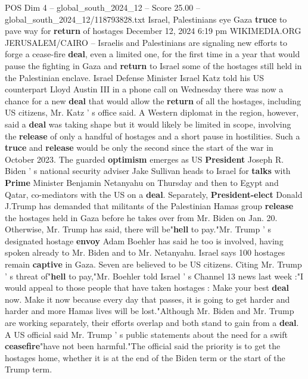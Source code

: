 \begin{textsample}{POS Dim 4 – global\_south\_2024\_12 – Score 25.00 – global\_south\_2024\_12/118793828.txt}  \label{ex:f4_pos_253}
Israel, Palestinians eye Gaza \textbf{truce} to pave way for \textbf{return} of hostages December 12, 2024 6:19 pm WIKIMEDIA.ORG JERUSALEM/CAIRO -- Israelis and Palestinians are signaling new efforts to forge a cease-fire \textbf{deal}, even a limited one, for the first time in a year that would pause the fighting in Gaza and \textbf{return} to Israel some of the hostages still held in the Palestinian enclave.
Israel Defense Minister Israel Katz told his US counterpart Lloyd Austin III in a phone call on Wednesday there was now a chance for a new \textbf{deal} that would allow the \textbf{return} of all the hostages, including US citizens, Mr.
Katz ' s office said.
A Western diplomat in the region, however, said a \textbf{deal} was taking shape but it would likely be limited in scope, involving the \textbf{release} of only a handful of hostages and a short pause in hostilities.
Such a \textbf{truce} and \textbf{release} would be only the second since the start of the war in October 2023.
The guarded \textbf{optimism} emerges as US \textbf{President} Joseph R.
Biden ' s national security adviser Jake Sullivan heads to Israel for \textbf{talks} with \textbf{Prime} Minister Benjamin Netanyahu on Thursday and then to Egypt and Qatar, co-mediators with the US on a \textbf{deal}.
Separately, \textbf{President-elect} Donald J.Trump has demanded that militants of the Palestinian Hamas group \textbf{release} the hostages held in Gaza before he takes over from Mr.
Biden on Jan. 20.
Otherwise, Mr.
Trump has said, there will be"\textbf{hell} to pay."Mr.
Trump ' s designated hostage \textbf{envoy} Adam Boehler has said he too is involved, having spoken already to Mr.
Biden and to Mr.
Netanyahu.
Israel says 100 hostages remain \textbf{captive} in Gaza.
Seven are believed to be US citizens.
Citing Mr.
Trump ' s threat of"\textbf{hell} to pay,"Mr.
Boehler told Israel ' s Channel 13 news last week :"I would appeal to those people that have taken hostages : Make your best \textbf{deal} now.
Make it now because every day that passes, it is going to get harder and harder and more Hamas lives will be lost."Although Mr.
Biden and Mr.
Trump are working separately, their efforts overlap and both stand to gain from a \textbf{deal}.
A US official said Mr.
Trump ' s public statements about the need for a swift \textbf{ceasefire}"have not been harmful."The official said the priority is to get the hostages home, whether it is at the end of the Biden term or the start of the Trump term.

\end{textsample}
